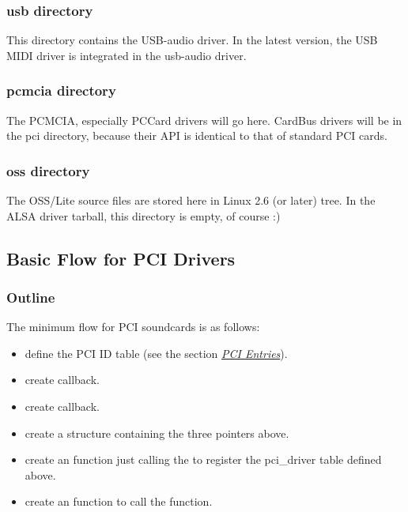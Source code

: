 \documentclass[a4paper,8pt,english]{sphinxmanual}
\begin{document}
\subsubsection{usb directory}
\label{sound/kernel-api/writing-an-alsa-driver:usb-directory}
This directory contains the USB-audio driver. In the latest version, the
USB MIDI driver is integrated in the usb-audio driver.


\subsubsection{pcmcia directory}
\label{sound/kernel-api/writing-an-alsa-driver:pcmcia-directory}
The PCMCIA, especially PCCard drivers will go here. CardBus drivers will
be in the pci directory, because their API is identical to that of
standard PCI cards.


\subsubsection{oss directory}
\label{sound/kernel-api/writing-an-alsa-driver:oss-directory}
The OSS/Lite source files are stored here in Linux 2.6 (or later) tree.
In the ALSA driver tarball, this directory is empty, of course :)


\subsection{Basic Flow for PCI Drivers}
\label{sound/kernel-api/writing-an-alsa-driver:basic-flow-for-pci-drivers}

\subsubsection{Outline}
\label{sound/kernel-api/writing-an-alsa-driver:outline}
The minimum flow for PCI soundcards is as follows:
\begin{itemize}
\item {} 
define the PCI ID table (see the section {\hyperref[sound/kernel\string-api/writing\string-an\string-alsa\string-driver:pci\string-entries]{\emph{PCI Entries}}}).

\item {} 
create  callback.

\item {} 
create  callback.

\item {} 
create a  structure
containing the three pointers above.

\item {} 
create an  function just calling the
 to register the pci\_driver
table defined above.

\item {} 
create an  function to call the
 function.

\end{itemize}
\end{document}
